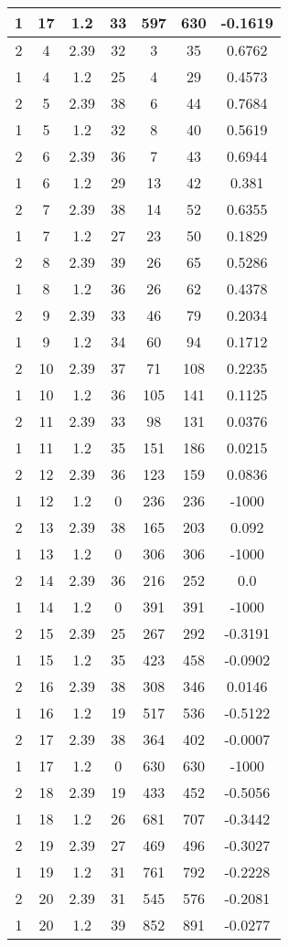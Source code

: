 \documentclass[letterpaper, 12pt]{article}
\begin{document}
\begin{longtable}{|c|c|c|c|c|c|c|}
\hline
1 & 17 & 1.2 & 33 & 597 & 630 & -0.1619 \\
\hline
2 & 4 & 2.39 & 32 & 3 & 35 & 0.6762 \\
\hline
1 & 4 & 1.2 & 25 & 4 & 29 & 0.4573 \\
\hline
2 & 5 & 2.39 & 38 & 6 & 44 & 0.7684 \\
\hline
1 & 5 & 1.2 & 32 & 8 & 40 & 0.5619 \\
\hline
2 & 6 & 2.39 & 36 & 7 & 43 & 0.6944 \\
\hline
1 & 6 & 1.2 & 29 & 13 & 42 & 0.381 \\
\hline
2 & 7 & 2.39 & 38 & 14 & 52 & 0.6355 \\
\hline
1 & 7 & 1.2 & 27 & 23 & 50 & 0.1829 \\
\hline
2 & 8 & 2.39 & 39 & 26 & 65 & 0.5286 \\
\hline
1 & 8 & 1.2 & 36 & 26 & 62 & 0.4378 \\
\hline
2 & 9 & 2.39 & 33 & 46 & 79 & 0.2034 \\
\hline
1 & 9 & 1.2 & 34 & 60 & 94 & 0.1712 \\
\hline
2 & 10 & 2.39 & 37 & 71 & 108 & 0.2235 \\
\hline
1 & 10 & 1.2 & 36 & 105 & 141 & 0.1125 \\
\hline
2 & 11 & 2.39 & 33 & 98 & 131 & 0.0376 \\
\hline
1 & 11 & 1.2 & 35 & 151 & 186 & 0.0215 \\
\hline
2 & 12 & 2.39 & 36 & 123 & 159 & 0.0836 \\
\hline
1 & 12 & 1.2 & 0 & 236 & 236 & -1000 \\
\hline
2 & 13 & 2.39 & 38 & 165 & 203 & 0.092 \\
\hline
1 & 13 & 1.2 & 0 & 306 & 306 & -1000 \\
\hline
2 & 14 & 2.39 & 36 & 216 & 252 & 0.0 \\
\hline
1 & 14 & 1.2 & 0 & 391 & 391 & -1000 \\
\hline
2 & 15 & 2.39 & 25 & 267 & 292 & -0.3191 \\
\hline
1 & 15 & 1.2 & 35 & 423 & 458 & -0.0902 \\
\hline
2 & 16 & 2.39 & 38 & 308 & 346 & 0.0146 \\
\hline
1 & 16 & 1.2 & 19 & 517 & 536 & -0.5122 \\
\hline
2 & 17 & 2.39 & 38 & 364 & 402 & -0.0007 \\
\hline
1 & 17 & 1.2 & 0 & 630 & 630 & -1000 \\
\hline
2 & 18 & 2.39 & 19 & 433 & 452 & -0.5056 \\
\hline
1 & 18 & 1.2 & 26 & 681 & 707 & -0.3442 \\
\hline
2 & 19 & 2.39 & 27 & 469 & 496 & -0.3027 \\
\hline
1 & 19 & 1.2 & 31 & 761 & 792 & -0.2228 \\
\hline
2 & 20 & 2.39 & 31 & 545 & 576 & -0.2081 \\
\hline
1 & 20 & 1.2 & 39 & 852 & 891 & -0.0277 \\
\hline
\end{longtable}
\end{document}
